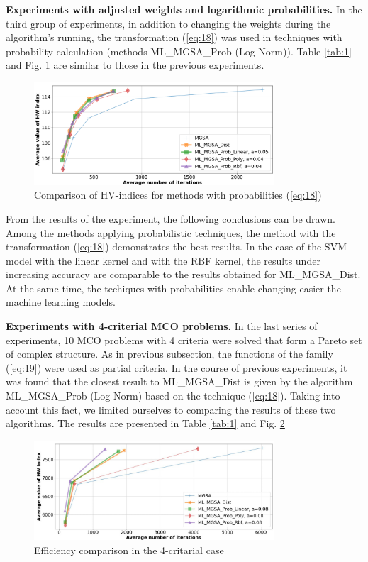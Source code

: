 \documentclass[runningheads]{llncs}
\begin{document}
\textbf{Experiments with adjusted weights and logarithmic probabilities.} In the third group of experiments, in addition to changing the weights during the algorithm’s running, the transformation (\ref{eq:18}) was used in techniques with probability calculation (methods ML\_MGSA\_Prob (Log Norm)). Table \ref{tab:1} and Fig. \ref{fig:5} are similar to those in the previous experiments.

\begin{figure}[t!]
\centering
\includegraphics[width=0.8\textwidth]{fig5.png}
\caption{Comparison of  HV-indices for methods with probabilities (\ref{eq:18})} 
\label{fig:5}
\end{figure}

From the results of the experiment, the following conclusions can be drawn. Among the methods applying probabilistic techniques, the method with the transformation (\ref{eq:18}) demonstrates the best results. In the case of the SVM model with the linear kernel and with the RBF kernel, the results under increasing accuracy are comparable to the results obtained for ML\_MGSA\_Dist. At the same time, the techiques with probabilities enable changing easier the machine learning models. 

\textbf{Experiments with 4-criterial MCO problems.} In the last series of experiments, 10 MCO problems with 4 criteria were solved that form a Pareto set of complex structure. As in previous subsection, the functions of the family (\ref{eq:19}) were used as partial criteria. In the course of previous experiments, it was found that the closest result to ML\_MGSA\_Dist is given by the algorithm ML\_MGSA\_Prob (Log Norm) based on the technique (\ref{eq:18}). Taking into account this fact, we limited ourselves to comparing the results of these two algorithms. The results are presented in Table \ref{tab:1} and Fig. \ref{fig:6}

\begin{figure}[t!]
\centering
\includegraphics[width=0.8\textwidth]{Fig6.png}
\caption{Efficiency comparison in the 4-critarial case} 
\label{fig:6}
\end{figure}
\end{document}
